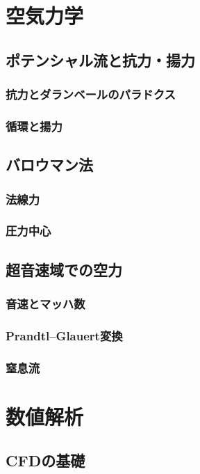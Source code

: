 \documentclass[uplatex,dvipdfmx,a4j,11pt]{jsreport}
\numberwithin{equation}{chapter}
\begin{document}
\chapter{空気力学}

\section{ポテンシャル流と抗力・揚力}
\subsection{抗力とダランベールのパラドクス}

\subsection{循環と揚力}

\section{バロウマン法}
\subsection{法線力}
\subsection{圧力中心}


\section{超音速域での空力}
\subsection{音速とマッハ数}

\subsection{Prandtl--Glauert変換}

\subsection{窒息流}


\chapter{数値解析}

\section{CFDの基礎}
\end{document}

